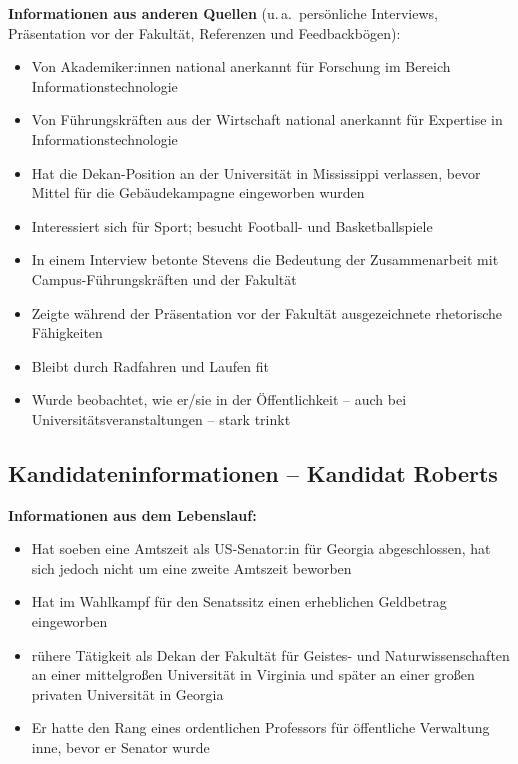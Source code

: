 \textbf{Informationen aus anderen Quellen}
(u.\,a.\ persönliche Interviews, Präsentation vor der Fakultät, Referenzen und Feedbackbögen):
\begin{itemize}
  \item Von Akademiker:innen national anerkannt für Forschung im Bereich Informationstechnologie
  \item Von Führungskräften aus der Wirtschaft national anerkannt für Expertise in Informationstechnologie
  \item Hat die Dekan-Position an der Universität in Mississippi verlassen, bevor Mittel für die
    Gebäudekampagne eingeworben wurden
  \item Interessiert sich für Sport; besucht Football- und Basketballspiele
  \item In einem Interview betonte Stevens die Bedeutung der Zusammenarbeit mit Campus-Führungskräften
    und der Fakultät
  \item Zeigte während der Präsentation vor der Fakultät ausgezeichnete rhetorische Fähigkeiten
  \item Bleibt durch Radfahren und Laufen fit
  \item Wurde beobachtet, wie er/sie in der Öffentlichkeit -- auch bei Universitätsveranstaltungen --
    stark trinkt
\end{itemize}

\clearpage
\subsection*{Kandidateninformationen -- Kandidat Roberts}
\thispagestyle{empty}

\textbf{Informationen aus dem Lebenslauf:}
\begin{itemize}
  \item Hat soeben eine Amtszeit als US-Senator:in für Georgia abgeschlossen, hat sich jedoch nicht um
    eine zweite Amtszeit beworben
  \item Hat im Wahlkampf für den Senatssitz einen erheblichen Geldbetrag eingeworben
  \item rühere Tätigkeit als Dekan der Fakultät für Geistes- und Naturwissenschaften an
    einer mittelgroßen Universität in Virginia und später an einer großen privaten
    Universität in Georgia
  \item Er hatte den Rang eines ordentlichen Professors für öffentliche Verwaltung inne,
    bevor er Senator wurde
\end{itemize}

